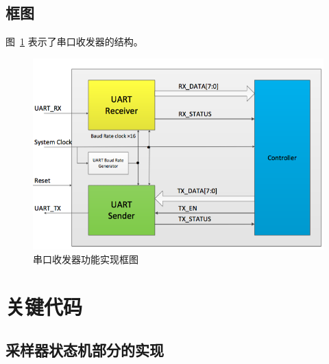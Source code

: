 \documentclass[11pt,a4paper]{article}
\begin{document}
\subsection{框图}
图~\ref{fig:串口收发器功能实现框图} 表示了串口收发器的结构。

\begin{figure}[htb]
  \centering
    \includegraphics[width=\textwidth]{structure}
  \caption{串口收发器功能实现框图}
  \label{fig:串口收发器功能实现框图}
\end{figure}


\section{关键代码}

\subsection{采样器状态机部分的实现}
\end{document}
